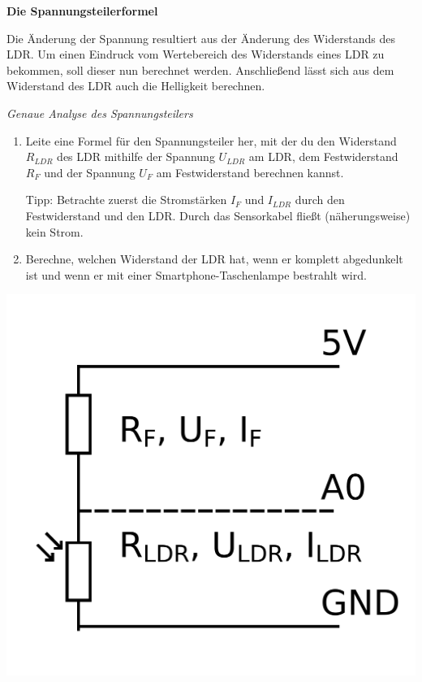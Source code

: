 \documentclass[ngerman, 11pt]{scrreprt}
\begin{document}
	
	\textbf{Die Spannungsteilerformel}
	
	Die Änderung der Spannung resultiert aus der Änderung des Widerstands des LDR. Um einen Eindruck vom Wertebereich des Widerstands eines LDR zu bekommen, soll dieser nun berechnet werden. Anschließend lässt sich aus dem Widerstand des LDR auch die Helligkeit berechnen.
	
	\medskip
	\begin{minipage}{0.73\textwidth}
		\begin{aufgabe*} \emph{Genaue Analyse des Spannungsteilers}
			\vspace{-0.3\baselineskip}
			\begin{enumerate}[label=\alph*), itemsep=0ex, parsep=0mm]
				\item Leite eine Formel für den Spannungsteiler her, mit der du den Widerstand $R_{LDR}$ des LDR mithilfe der Spannung $U_{LDR}$ am LDR, dem Festwiderstand $R_F$ und der Spannung $U_F$ am Festwiderstand berechnen kannst.
				
				Tipp: Betrachte zuerst die Stromstärken $I_F$ und $I_{LDR}$ durch den Festwiderstand und den LDR. Durch das Sensorkabel fließt (näherungsweise) kein Strom.
				\item Berechne, welchen Widerstand der LDR hat, wenn er komplett abgedunkelt ist und wenn er mit einer Smartphone-Taschenlampe bestrahlt wird.
			\end{enumerate}
		\end{aufgabe*}
	\end{minipage}
	\hfill
	\begin{minipage}{0.25\textwidth}
		\centering
		\includegraphics[width=\textwidth]{../Zeichnungen/spannungsteiler-ldr-beschriftet.png}
	\end{minipage}
\end{document}
